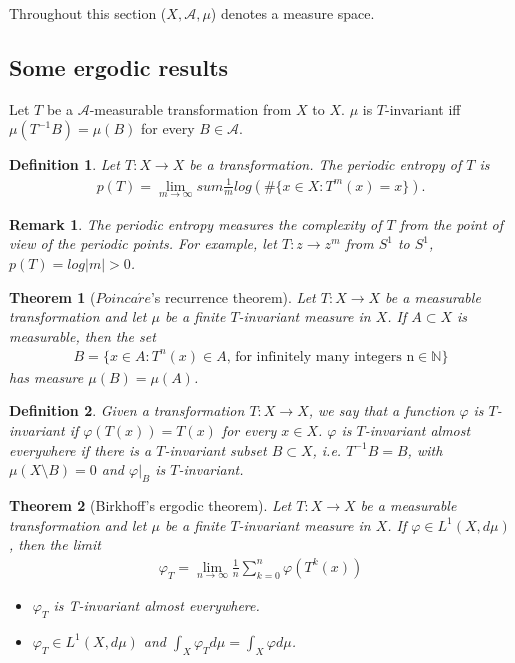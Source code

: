 \documentclass[a4paper,10pt]{amsart}
\newtheorem{theorem}{Theorem}[section]
\newtheorem{definition}{Definition}[section]
\newtheorem{remark}{Remark}[section]
\newcommand{\A}{\mathcal{A}}
\newcommand{\N}{\mathbb N} %
\begin{document}
Throughout this section ($X, \A, \mu$) denotes a measure space.

\subsection{Some ergodic results}

Let $T$ be a $\A$-measurable transformation from $X$ to $X$.
$\mu$ is $T$-invariant iff $\mu(T^{-1}B) = \mu(B)$ for every $B \in \A$.

\begin{definition}
   Let $T : X  \rightarrow X$ be a transformation. The periodic entropy
   of $T$ is 
   \begin{align*}
       p(T) = \lim_{m \rightarrow \infty} sum \frac{1}{m}
       log(\#\{x \in X : T^{m}(x)=x \}).
   \end{align*}
\end{definition}

\begin{remark}
   The periodic entropy measures the complexity of $T$ from the 
   point of view of the periodic points. For example, let 
   $T : z \rightarrow z^m$ from $S^1$ to $S^1$, 
   $p(T) = log|m| >0$.
\end{remark}

\begin{theorem}[$Poinca\acute{r}e$'s recurrence theorem]
   Let $T : X \rightarrow X$ be a measurable transformation and 
   let $\mu$ be a finite $T$-invariant measure in $X$. If $A \subset X$
   is measurable, then the set
   \begin{align*}
    B = \{ x \in A: T^n (x) \in A 
    \mbox{, for infinitely many integers n} \in \N \} 
   \end{align*}
   has measure $\mu(B) = \mu(A)$.
\end{theorem}

\begin{definition}
   Given a transformation $T: X \rightarrow X$, we say that 
   a function $\varphi$ is $T$-invariant if $\varphi(T(x)) = T(x)$ for 
   every $x \in X$. $\varphi$ is $T$-invariant almost everywhere
   if there is a $T$-invariant subset $B \subset X$, i.e. 
   $T^{-1}B = B$, with $\mu(X \setminus B) = 0$ and $\varphi|_{B}$ is
   $T$-invariant.
\end{definition}

\begin{theorem}[Birkhoff's ergodic theorem]
   Let $T : X \rightarrow X$ be a measurable transformation
   and let $\mu$ be a finite $T$-invariant measure in $X$. If
   $\varphi \in L^{1}(X, d\mu)$, then the limit
   \begin{align*}
       \varphi_{T} = \lim_{n \rightarrow \infty}\frac{1}{n}
       \sum_{k = 0}^{n} \varphi(T^k (x))
   \end{align*}
   \begin{itemize}
       \item $\varphi_{T}$ is T-invariant almost everywhere.
       \item $\varphi_{T} \in L^{1}(X, d\mu)$ and 
           $\int_{X}\varphi_{T} d\mu = \int_{X} \varphi d\mu$.
   \end{itemize}
\end{theorem}
\end{document}
